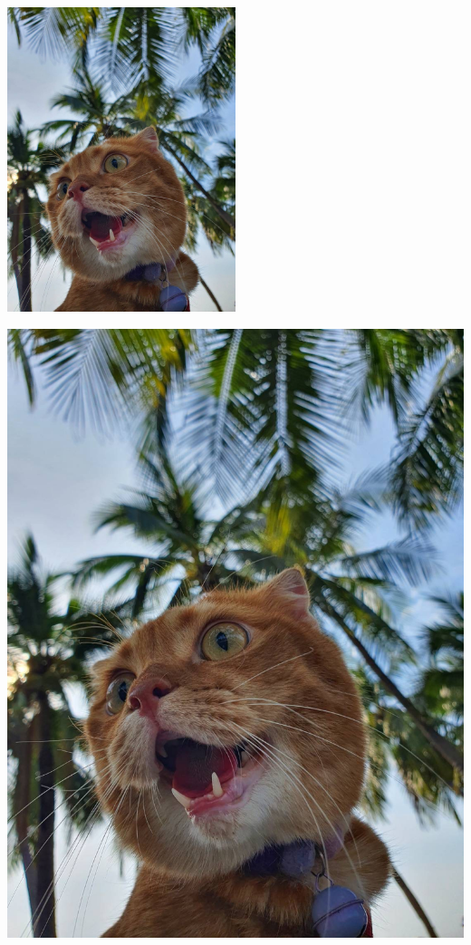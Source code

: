 \documentclass{article}
\begin{document}
\lipsum[1-4]

\begin{center}
  \includegraphics[width = 0.5\textwidth]{garfield.JPG}
\end{center}

\lipsum[5-7]
\begin{center}
  \includegraphics[width = 0.5\linewidth]{garfield.JPG}
\end{center}

\lipsum[9-12]


\end{document}
